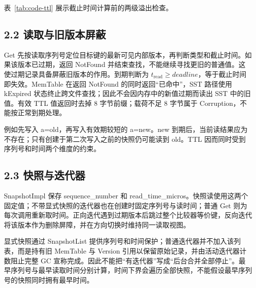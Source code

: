 \documentclass[UTF8,a4paper,10pt,twocolumn,fontset=fandol]{ctexart}
\begin{document}
表~\ref{tab:code-ttl} 展示截止时间计算前的两级溢出检查。

\subsection*{2.2 读取与旧版本屏蔽}
Get 先按读取序列号定位目标键的最新可见内部版本，再判断类型和截止时间。如果该版本已过期，返回 NotFound 并结束查找，不能继续寻找更旧的普通值。这使过期记录具备屏蔽旧版本的作用。到期判断为 $t_{\mathrm{read}}\geq deadline$，等于截止时间即失效。MemTable 在返回 NotFound 的同时返回“已命中”，SST 路径使用 kExpired 状态终止跨文件查找；因此不会因内存中的新值过期而读出 SST 中的旧值。有效 TTL 值返回时去掉 8 字节前缀；载荷不足 8 字节属于 Corruption，不能按正常到期处理。

例如先写入 a=old，再写入有效期较短的 a=new。new 到期后，当前读结果应为不存在；只有创建于第二次写入之前的快照仍可能读到 old。TTL 因而同时受到序列号和时间两个维度的约束。

\subsection*{2.3 快照与迭代器}
SnapshotImpl 保存 sequence\_number 和 read\_time\_micros。快照读使用这两个固定值；不带显式快照的迭代器也在创建时固定序列号与读时间；普通 Get 则为每次调用重新取时间。正向迭代遇到过期版本后跳过整个比较器等价键，反向迭代将该版本作为删除屏障，并在方向切换时维持同一读取视图。

显式快照通过 SnapshotList 提供序列号和时间保护；普通迭代器并不加入该列表，而是持有旧 MemTable 与 Version 引用以保留原始记录，并由活动迭代器计数阻止完整 GC 宣称完成。因此不能把“有迭代器”写成“后台合并全部停止”。最早序列号与最早读取时间分别计算，时间下界会遍历全部快照，不能假设最早序列号的快照同时拥有最早时间。
\end{document}
